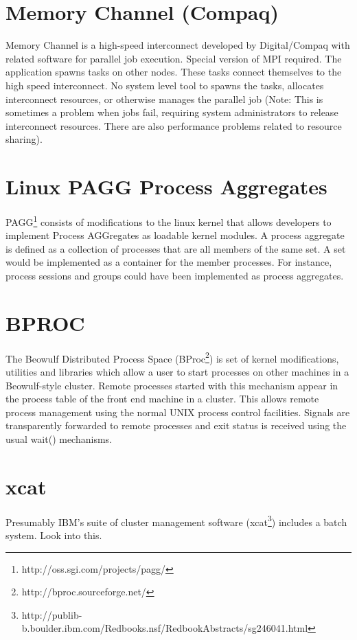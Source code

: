 \documentclass{article}
\begin{document}
\section{Memory Channel (Compaq)}

Memory Channel is a high-speed interconnect developed by 
Digital/Compaq with related software for parallel job execution. 
Special version of MPI required. The application spawns tasks on 
other nodes. These tasks connect themselves to the high speed 
interconnect. No system level tool to spawns the tasks, allocates 
interconnect resources, or otherwise manages the parallel job (Note: 
This is sometimes a problem when jobs fail, requiring system 
administrators to release interconnect resources. There are also 
performance problems related to resource sharing).

\section{Linux PAGG Process Aggregates}


PAGG\footnote{http://oss.sgi.com/projects/pagg/}
consists of modifications to the linux kernel that allows
developers to implement Process AGGregates as loadable kernel modules.
A process aggregate is defined as a collection of processes that are
all members of the same set. A set would be implemented as a container
for the member processes. For instance, process sessions and groups
could have been implemented as process aggregates.

\section{BPROC}


The Beowulf Distributed Process Space 
(BProc\footnote{http://bproc.sourceforge.net/})
is set of kernel
modifications, utilities and libraries which allow a user to start
processes on other machines in a Beowulf-style cluster.  Remote
processes started with this mechanism appear in the process table
of the front end machine in a cluster. This allows remote process
management using the normal UNIX process control facilities. Signals
are transparently forwarded to remote processes and exit status is
received using the usual wait() mechanisms.

\section{xcat}

Presumably IBM's suite of cluster management software 
(xcat\footnote{http://publib-b.boulder.ibm.com/Redbooks.nsf/RedbookAbstracts/sg246041.html})
includes a batch system.  Look into this.
\end{document}

